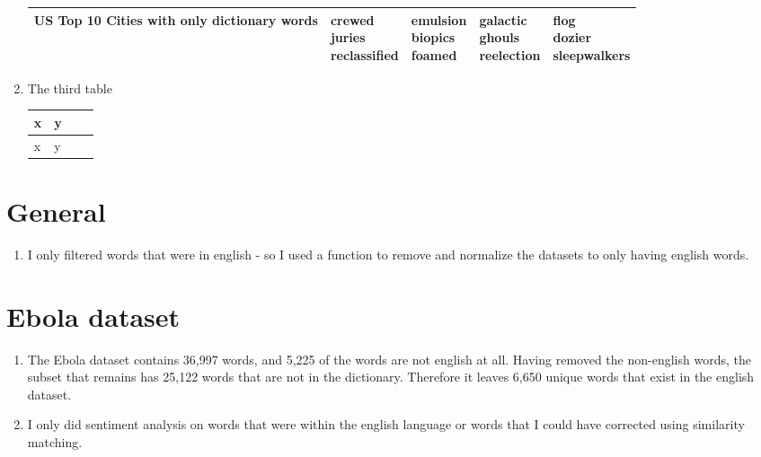 \documentclass[11pt, oneside]{article}
\makeatletter
\newcommand{\specialcell}[2][c]{%
  \begin{tabular}[#1]{@{}c@{}}#2\end{tabular}}
\makeatother
\begin{document}
\begin{enumerate}
\begin{tabularx}{\textwidth}{X|l|l|l|l}
\hline US Top 10 Cities with only dictionary words & 
\specialcell{crewed\\juries\\reclassified} & 
\specialcell{emulsion\\biopics\\foamed} & 
\specialcell{galactic\\ghouls\\reelection} & 
\specialcell{flog\\dozier\\sleepwalkers} \\ 

\hline \end{tabularx}

\item The third table

\begin{center}
    \begin{tabular}{| l | l | l | l |}
    \hline
    x & y \\ \hline
    x & y \\ \hline
    \end{tabular}
\end{center}

\end{enumerate}

\section*{General}

\begin{enumerate}
\item I only filtered words that were in english - so I used a function to remove and normalize the datasets to only having english words.
\end{enumerate}

\section*{Ebola dataset}

\begin{enumerate}
\item The Ebola dataset contains 36,997 words, and 5,225 of the words are not english at all. Having removed the non-english words, the subset that remains has 25,122 words that are not in the dictionary. Therefore it leaves 6,650 unique words that exist in the english dataset. 
\item I only did sentiment analysis on words that were within the english language or words that I could have corrected using similarity matching. 
\end{enumerate}
\end{document}
